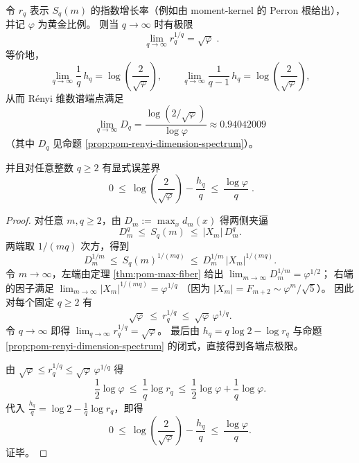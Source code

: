 \begin{proposition}\label{prop:pom-rq-qinfty-endpoint}
令 \(r_q\) 表示 \(S_q(m)\) 的指数增长率（例如由 moment-kernel 的 Perron 根给出），并记 \(\varphi\) 为黄金比例。
则当 \(q\to\infty\) 时有极限
\[
\boxed{\;
\lim_{q\to\infty} r_q^{1/q}=\sqrt{\varphi}\; }.
\]
等价地，
\[
\lim_{q\to\infty}\frac{1}{q}\,h_q
=\log\!\left(\frac{2}{\sqrt{\varphi}}\right),
\qquad
\lim_{q\to\infty}\frac{1}{q-1}\,h_q
=\log\!\left(\frac{2}{\sqrt{\varphi}}\right),
\]
从而 Rényi 维数谱端点满足
\[
\lim_{q\to\infty}D_q
=\frac{\log\!\left(2/\sqrt{\varphi}\right)}{\log\varphi}
\approx 0.94042009
\]
（其中 \(D_q\) 见命题 \ref{prop:pom-renyi-dimension-spectrum}）。
\par
并且对任意整数 \(q\ge 2\) 有显式误差界
\[
\boxed{\;
0\ \le\ \log\!\left(\frac{2}{\sqrt{\varphi}}\right)-\frac{h_q}{q}\ \le\ \frac{\log\varphi}{q}\; }.
\]
\end{proposition}
\begin{proof}
对任意 \(m,q\ge 2\)，由
\(
D_m:=\max_x d_m(x)
\)
得两侧夹逼
\[
D_m^q\ \le\ S_q(m)\ \le\ |X_m|\,D_m^q.
\]
两端取 \(1/(mq)\) 次方，得到
\[
D_m^{1/m}\ \le\ S_q(m)^{1/(mq)}\ \le\ D_m^{1/m}\,|X_m|^{1/(mq)}.
\]
令 \(m\to\infty\)，左端由定理 \ref{thm:pom-max-fiber} 给出
\(
\lim_{m\to\infty}D_m^{1/m}=\varphi^{1/2}
\)；
右端的因子满足
\(
\lim_{m\to\infty}|X_m|^{1/(mq)}=\varphi^{1/q}
\)
（因为 \(|X_m|=F_{m+2}\sim \varphi^m/\sqrt5\)）。
因此对每个固定 \(q\ge 2\) 有
\[
\sqrt{\varphi}\ \le\ r_q^{1/q}\ \le\ \sqrt{\varphi}\,\varphi^{1/q}.
\]
令 \(q\to\infty\) 即得 \(\lim_{q\to\infty}r_q^{1/q}=\sqrt{\varphi}\)。
最后由 \(h_q=q\log 2-\log r_q\) 与命题 \ref{prop:pom-renyi-dimension-spectrum} 的闭式，直接得到各端点极限。
\par
由 \(\sqrt{\varphi}\le r_q^{1/q}\le \sqrt{\varphi}\,\varphi^{1/q}\) 得
\[
\frac{1}{2}\log\varphi\ \le\ \frac{1}{q}\log r_q\ \le\ \frac{1}{2}\log\varphi+\frac{1}{q}\log\varphi.
\]
代入 \(\frac{h_q}{q}=\log 2-\frac{1}{q}\log r_q\)，即得
\[
0\ \le\ \log\!\left(\frac{2}{\sqrt{\varphi}}\right)-\frac{h_q}{q}\ \le\ \frac{\log\varphi}{q}.
\]
证毕。
\end{proof}

